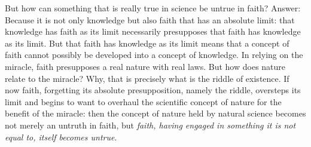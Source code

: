 \documentclass[12pt]{book}
\newcommand{\opage}[1]{\marginnote{\footnotesize\textit{[#1]}}}
\begin{document}
But how can something that is really true in science be untrue in faith? Answer: Because it is not only knowledge but also faith that has an absolute limit: that knowledge has faith as its limit necessarily presupposes that faith has knowledge as its limit. But that faith has knowledge as its limit means that a concept of faith cannot possibly be developed into a concept of knowledge. In relying on the miracle, faith presupposes a real nature with real laws. But how does nature relate to the miracle? Why, that is precisely what is the riddle of existence. If now faith, forgetting its absolute presupposition, namely the riddle, oversteps its limit and begins to want to overhaul the scientific concept of nature for the benefit of the miracle: then
\opage{33}\setcounter{footnote}{0}%
the concept of nature held by natural science becomes not merely an untruth in faith, but \emph{faith, having engaged in something it is not equal to, itself becomes untrue}.
\end{document}
